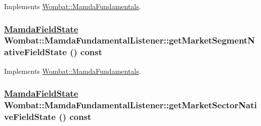 Implements \hyperlink{classWombat_1_1MamdaFundamentals_6409ffd956002efafa3c8881891d0378}{Wombat::Mamda\-Fundamentals}.\hypertarget{classWombat_1_1MamdaFundamentalListener_178e08697638bdf25d54e276ec416119}{
\subsubsection[getMarketSegmentNativeFieldState]{\setlength{\rightskip}{0pt plus 5cm}\hyperlink{namespaceWombat_93aac974f2ab713554fd12a1fa3b7d2a}{Mamda\-Field\-State} Wombat::Mamda\-Fundamental\-Listener::get\-Market\-Segment\-Native\-Field\-State () const}}
\label{classWombat_1_1MamdaFundamentalListener_178e08697638bdf25d54e276ec416119}




Implements \hyperlink{classWombat_1_1MamdaFundamentals_051e9a92d80a41fadf421c094b996b4c}{Wombat::Mamda\-Fundamentals}.\hypertarget{classWombat_1_1MamdaFundamentalListener_7c42cf22f6a4e6167f365df4cdad2c6c}{
\subsubsection[getMarketSectorNativeFieldState]{\setlength{\rightskip}{0pt plus 5cm}\hyperlink{namespaceWombat_93aac974f2ab713554fd12a1fa3b7d2a}{Mamda\-Field\-State} Wombat::Mamda\-Fundamental\-Listener::get\-Market\-Sector\-Native\-Field\-State () const}}
\label{classWombat_1_1MamdaFundamentalListener_7c42cf22f6a4e6167f365df4cdad2c6c}




